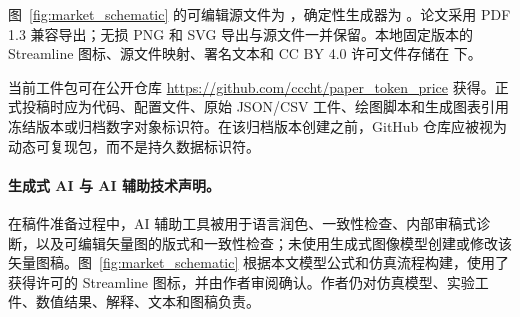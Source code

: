 \documentclass[UTF8,11pt,a4paper]{ctexart}
\begin{document}
图~\ref{fig:market_schematic} 的可编辑源文件为 ，确定性生成器为 。论文采用 PDF 1.3 兼容导出；无损 PNG 和 SVG 导出与源文件一并保留。本地固定版本的 Streamline 图标、源文件映射、署名文本和 CC BY 4.0 许可文件存储在  下。

当前工件包可在公开仓库 \url{https://github.com/cccht/paper_token_price} 获得。正式投稿时应为代码、配置文件、原始 JSON/CSV 工件、绘图脚本和生成图表引用冻结版本或归档数字对象标识符。在该归档版本创建之前，GitHub 仓库应被视为动态可复现包，而不是持久数据标识符。

\paragraph{生成式 AI 与 AI 辅助技术声明。}

在稿件准备过程中，AI 辅助工具被用于语言润色、一致性检查、内部审稿式诊断，以及可编辑矢量图的版式和一致性检查；未使用生成式图像模型创建或修改该矢量图稿。图~\ref{fig:market_schematic} 根据本文模型公式和仿真流程构建，使用了获得许可的 Streamline 图标，并由作者审阅确认。作者仍对仿真模型、实验工件、数值结果、解释、文本和图稿负责。

\small


\end{document}
